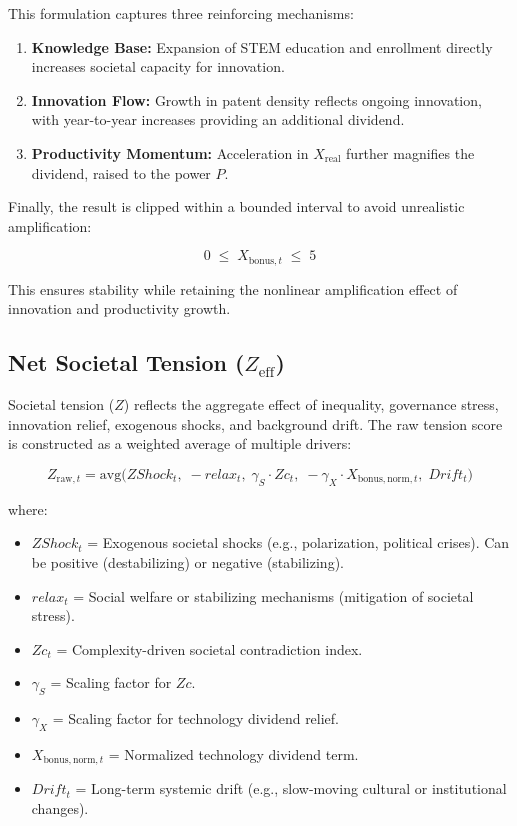 \documentclass[12pt,a4paper]{article}
\begin{document}
\noindent This formulation captures three reinforcing mechanisms:
\begin{enumerate}
    \item \textbf{Knowledge Base:} Expansion of STEM education and enrollment directly increases societal capacity for innovation.
    \item \textbf{Innovation Flow:} Growth in patent density reflects ongoing innovation, with year-to-year increases providing an additional dividend.
    \item \textbf{Productivity Momentum:} Acceleration in $X_{\mathrm{real}}$ further magnifies the dividend, raised to the power $P$.
\end{enumerate}

Finally, the result is clipped within a bounded interval to avoid unrealistic amplification:

\begin{equation}
0 \; \leq \; X_{\mathrm{bonus},t} \; \leq \; 5
\end{equation}

\noindent This ensures stability while retaining the nonlinear amplification effect of innovation and productivity growth.
\subsection{Net Societal Tension (\texorpdfstring{$Z_{\mathrm{eff}}$}{Zeff})}

Societal tension ($Z$) reflects the aggregate effect of inequality, governance stress, 
innovation relief, exogenous shocks, and background drift. 
The raw tension score is constructed as a weighted average of multiple drivers:

\begin{equation}
Z_{\mathrm{raw},t} = \mathrm{avg}\big( ZShock_t,\; -relax_t,\; \gamma_S \cdot Zc_t,\; -\gamma_X \cdot X_{\mathrm{bonus,norm},t},\; Drift_t \big)
\end{equation}

\noindent where:
\begin{itemize}
    \item $ZShock_t$ = Exogenous societal shocks (e.g., polarization, political crises). Can be positive (destabilizing) or negative (stabilizing).
    \item $relax_t$ = Social welfare or stabilizing mechanisms (mitigation of societal stress).
    \item $Zc_t$ = Complexity-driven societal contradiction index.
    \item $\gamma_S$ = Scaling factor for $Zc$.
    \item $\gamma_X$ = Scaling factor for technology dividend relief.
    \item $X_{\mathrm{bonus,norm},t}$ = Normalized technology dividend term.
    \item $Drift_t$ = Long-term systemic drift (e.g., slow-moving cultural or institutional changes).
\end{itemize}
\end{document}
